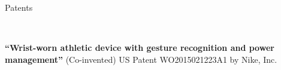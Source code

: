 \documentclass[9pt]{article}
\newenvironment{changemargin}[2]{%
  \begin{list}{}{%
    \setlength{\topsep}{0pt}%
    \setlength{\leftmargin}{#1}%
    \setlength{\rightmargin}{#2}%
    \setlength{\listparindent}{\parindent}%
    \setlength{\itemindent}{\parindent}%
    \setlength{\parsep}{\parskip}%
  }%
  \item[]}{\end{list}
}
\newcommand{\lineover}{
    \begin{changemargin}{-0.05in}{-0.05in}
        \vspace*{-8pt}
        \hrulefill \\
        \vspace*{-2pt}
    \end{changemargin}
}
\newcommand{\header}[1]{
    \begin{changemargin}{-0.5in}{-0.5in}
        {\large #1}\\
        \lineover
    \end{changemargin}
}
\newenvironment{body} {
    \vspace*{-16pt}
    \begin{changemargin}{-0.20in}{-0.5in}
  }
    {\end{changemargin}
}
\begin{document}
\smallskip



\header{Patents}
\begin{body}
    \vspace{14pt}
    \textbf{``Wrist-worn athletic device with gesture recognition and power management''} (Co-invented) US Patent WO2015021223A1 by Nike, Inc.
\end{body}

\smallskip


\end{document}
